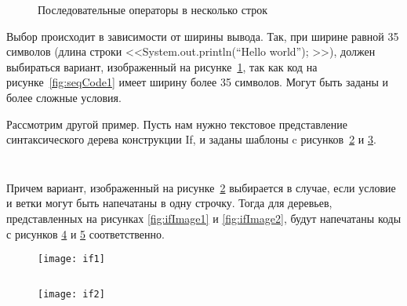 \begin{figure}[h]
	\inputminted{c}{codes/seqCode2.java}
	\caption{Последовательные операторы в несколько строк}
	\label{fig:seqCode2}
\end{figure}

Выбор происходит в зависимости от ширины вывода. Так, при ширине равной 35 символов (длина строки <<System.out.println(“Hello world”); >>), должен выбираться вариант, изображенный на рисунке~\ref{fig:seqCode2}, так как код на рисунке~\ref{fig:seqCode1} имеет ширину более 35 символов.
Могут быть заданы и более сложные условия.

\newpage

Рассмотрим другой пример. Пусть нам нужно текстовое представление синтаксического дерева конструкции If, и заданы шаблоны c рисунков~\ref{fig:ifTemplate1} и \ref{fig:ifTemplate2}.

\begin{figure}[h]
	\inputminted{haskell}{codes/ifTemplate1.hs}
	\caption{}
	\label{fig:ifTemplate1}
\end{figure}

\begin{figure}[h]
	\inputminted{haskell}{codes/ifTemplate2.hs}
	\caption{}
	\label{fig:ifTemplate2}
\end{figure}

Причем вариант, изображенный на рисунке~\ref{fig:ifTemplate1} выбирается в случае, если условие и ветки могут быть напечатаны в одну строчку. Тогда для деревьев, представленных на рисунках \ref{fig:ifImage1} и \ref{fig:ifImage2}, будут напечатаны коды с рисунков \ref{fig:ifCode1} и \ref{fig:ifCode2} соответственно.

\begin{figure}[h!]
	\begin{minipage}[b]{0.65\linewidth}
		\centering
		\texttt{[image: if1]}
		\caption{}
		\label{fig:ifImage1}
	\end{minipage}
	\hspace{0.5cm}
	\begin{minipage}[b]{0.25\linewidth}
		\centering
		\inputminted{haskell}{codes/ifCode1.hs}
		\caption{}
		\label{fig:ifCode1}
	\end{minipage}
\end{figure}

\begin{figure}[h!]
	\begin{minipage}[b]{0.65\linewidth}
		\centering
		\texttt{[image: if2]}
		\caption{}
		\label{fig:ifImage2}
	\end{minipage}
	\hspace{0.5cm}
	\begin{minipage}[b]{0.25\linewidth}
		\centering
		\inputminted{haskell}{codes/ifCode2.hs}
		\caption{}
		\label{fig:ifCode2}
	\end{minipage}
\end{figure}

